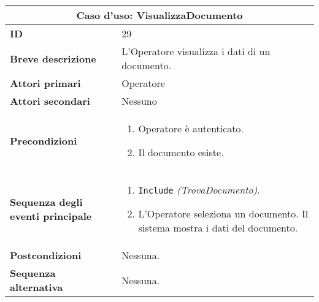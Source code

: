\documentclass[a4paper]{report}
\begin{document}
\clearpage
\begin{table}[H]
\vspace*{-0cm}
\renewcommand{\arraystretch}{1.9}
\begin{tabular}{|p{3.9cm}|p{9.9cm}|}
\hline
\multicolumn{2}{|c|}{\textbf{Caso d’uso: VisualizzaDocumento}} \\ \hline
	\textbf{ID} & 29 \\ \hline
	\textbf{Breve descrizione} & L’Operatore visualizza i dati di un documento. \\ \hline
	\textbf{Attori primari} & Operatore \\ \hline
	\textbf{Attori secondari} & Nessuno \\ \hline
	\textbf{Precondizioni} & \begin{enumerate}[leftmargin=14pt,label=\arabic*.,labelsep=0.5em,topsep=0pt,partopsep=0pt,parsep=0pt,itemsep=0pt]
        \item Operatore è autenticato. 
        \item Il documento esiste.
    \end{enumerate} \\ \hline
	\textbf{Sequenza degli eventi principale} &
    \begin{enumerate}[leftmargin=14pt,label=\arabic*.,labelsep=0.5em,topsep=0pt,partopsep=0pt,parsep=0pt,itemsep=0pt]
        \item \texttt{Include} \textit{(TrovaDocumento)}. 
        \item L'Operatore seleziona un documento. Il sistema mostra i dati del documento.
    \end{enumerate} \\ \hline
	\textbf{Postcondizioni} & Nessuna. \\ \hline
	\textbf{Sequenza alternativa} & Nessuna. \\ \hline
\end{tabular}
\end{table}
\end{document}
